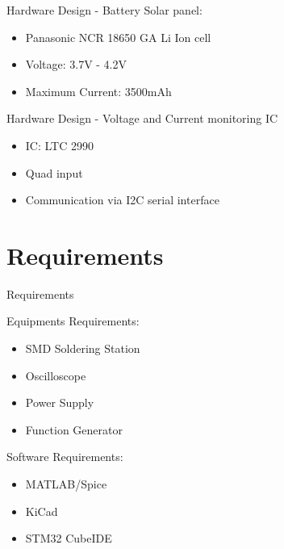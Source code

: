 \documentclass[aspectratio=169]{beamer}
\begin{document}
		\begin{frame}{Hardware Design - Battery}
		Solar panel:
		\begin{itemize}
			\item Panasonic NCR 18650 GA Li Ion cell
			\item Voltage: 3.7V - 4.2V
			\item Maximum Current: 3500mAh

		\end{itemize}
	\end{frame}
	
	
		\begin{frame}{Hardware Design - Voltage and Current monitoring IC}
		
			\begin{itemize}
			\item IC: LTC 2990
			\item Quad input
			\item Communication via I2C serial interface
		\end{itemize}
	\end{frame}
	
	
	
	\section{Requirements}
	\begin{frame}{Requirements}
		\begin{minipage}{0.5\textwidth}
			Equipments Requirements:
			\begin{itemize}
				
				\item SMD Soldering Station
				\item Oscilloscope
				\item Power Supply
				\item Function Generator
			\end{itemize} 
		\end{minipage}
		\begin{minipage}{0.3\textwidth}
			Software Requirements:
			\begin{itemize}
				
				\item MATLAB/Spice
				\item KiCad
				\item STM32 CubeIDE
				
			\end{itemize} 
			
		\end{minipage}
	\end{frame}
	
\end{document}
